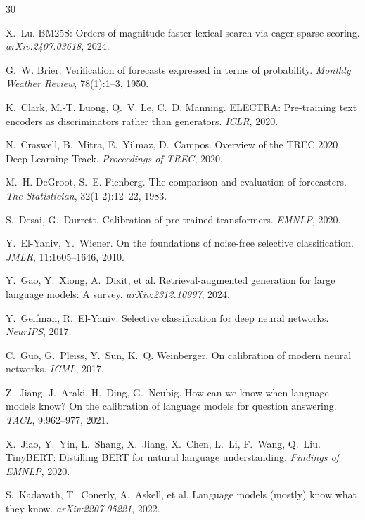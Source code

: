 
\begin{thebibliography}{30}

 X.~Lu.
BM25S: Orders of magnitude faster lexical search via eager sparse scoring.
\emph{arXiv:2407.03618}, 2024.

 G.~W. Brier.
Verification of forecasts expressed in terms of probability.
\emph{Monthly Weather Review}, 78(1):1--3, 1950.

 K.~Clark, M.-T. Luong, Q.~V. Le, C.~D. Manning.
ELECTRA: Pre-training text encoders as discriminators rather than generators.
\emph{ICLR}, 2020.

 N.~Craswell, B.~Mitra, E.~Yilmaz, D.~Campos.
Overview of the TREC 2020 Deep Learning Track.
\emph{Proceedings of TREC}, 2020.

 M.~H. DeGroot, S.~E. Fienberg.
The comparison and evaluation of forecasters.
\emph{The Statistician}, 32(1-2):12--22, 1983.

 S.~Desai, G.~Durrett.
Calibration of pre-trained transformers.
\emph{EMNLP}, 2020.

 Y.~El-Yaniv, Y.~Wiener.
On the foundations of noise-free selective classification.
\emph{JMLR}, 11:1605--1646, 2010.

 Y.~Gao, Y.~Xiong, A.~Dixit, et al.
Retrieval-augmented generation for large language models: A survey.
\emph{arXiv:2312.10997}, 2024.

 Y.~Geifman, R.~El-Yaniv.
Selective classification for deep neural networks.
\emph{NeurIPS}, 2017.

 C.~Guo, G.~Pleiss, Y.~Sun, K.~Q. Weinberger.
On calibration of modern neural networks.
\emph{ICML}, 2017.

 Z.~Jiang, J.~Araki, H.~Ding, G.~Neubig.
How can we know when language models know? On the calibration of language models
for question answering.
\emph{TACL}, 9:962--977, 2021.

 X.~Jiao, Y.~Yin, L.~Shang, X.~Jiang, X.~Chen,
L.~Li, F.~Wang, Q.~Liu.
TinyBERT: Distilling BERT for natural language understanding.
\emph{Findings of EMNLP}, 2020.

 S.~Kadavath, T.~Conerly, A.~Askell, et al.
Language models (mostly) know what they know.
\emph{arXiv:2207.05221}, 2022.


\end{thebibliography}
